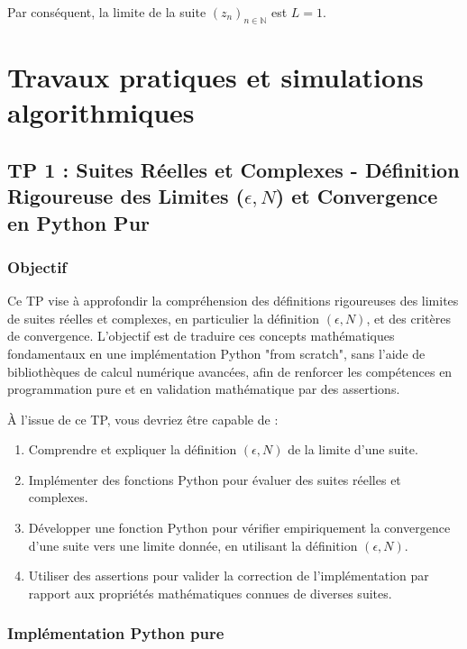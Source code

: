 \documentclass[a4paper,11pt]{report}
\begin{document}
Par conséquent, la limite de la suite $(z_n)_{n \in \mathbb{N}}$ est $L=1$.

\vspace{1cm}

\chapter{Travaux pratiques et simulations algorithmiques}

\section*{TP 1 : Suites Réelles et Complexes - Définition Rigoureuse des Limites ($\epsilon, N$) et Convergence en Python Pur}

\subsection*{Objectif}
Ce TP vise à approfondir la compréhension des définitions rigoureuses des limites de suites réelles et complexes, en particulier la définition $(\epsilon, N)$, et des critères de convergence. L'objectif est de traduire ces concepts mathématiques fondamentaux en une implémentation Python "from scratch", sans l'aide de bibliothèques de calcul numérique avancées, afin de renforcer les compétences en programmation pure et en validation mathématique par des assertions.

À l'issue de ce TP, vous devriez être capable de :
\begin{enumerate}
\item Comprendre et expliquer la définition $(\epsilon, N)$ de la limite d'une suite.

\item Implémenter des fonctions Python pour évaluer des suites réelles et complexes.

\item Développer une fonction Python pour vérifier empiriquement la convergence d'une suite vers une limite donnée, en utilisant la définition $(\epsilon, N)$.

\item Utiliser des assertions pour valider la correction de l'implémentation par rapport aux propriétés mathématiques connues de diverses suites.
\end{enumerate}

\subsection*{Implémentation Python pure}
\end{document}
